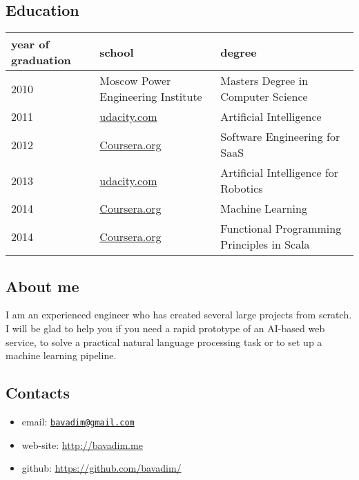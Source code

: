 \hypertarget{education}{%
\subsection{Education}\label{education}}

\begin{longtable}[]{@{}lll@{}}
\toprule
year of graduation & school & degree\tabularnewline
\midrule
\endhead
2010 & Moscow Power Engineering Institute & Masters Degree in Computer
Science\tabularnewline
2011 & \href{https://www.udacity.com}{udacity.com} & Artificial
Intelligence\tabularnewline
2012 & \href{https://www.coursera.org}{Coursera.org} & Software
Engineering for SaaS\tabularnewline
2013 & \href{https://www.udacity.com}{udacity.com} & Artificial
Intelligence for Robotics\tabularnewline
2014 & \href{https://www.coursera.org}{Coursera.org} & Machine
Learning\tabularnewline
2014 & \href{https://www.coursera.org}{Coursera.org} & Functional
Programming Principles in Scala\tabularnewline
\bottomrule
\end{longtable}

\hypertarget{about-me}{%
\subsection{About me}\label{about-me}}

I am an experienced engineer who has created several large projects from
scratch. I will be glad to help you if you need a rapid prototype of an
AI-based web service, to solve a practical natural language processing
task or to set up a machine learning pipeline.

\hypertarget{contacts}{%
\subsection{Contacts}\label{contacts}}

\begin{itemize}
\tightlist
\item
  email: \href{mailto:bavadim@gmail.com}{\nolinkurl{bavadim@gmail.com}}
\item
  web-site: \url{http://bavadim.me}
\item
  github: \url{https://github.com/bavadim/}
\end{itemize}
